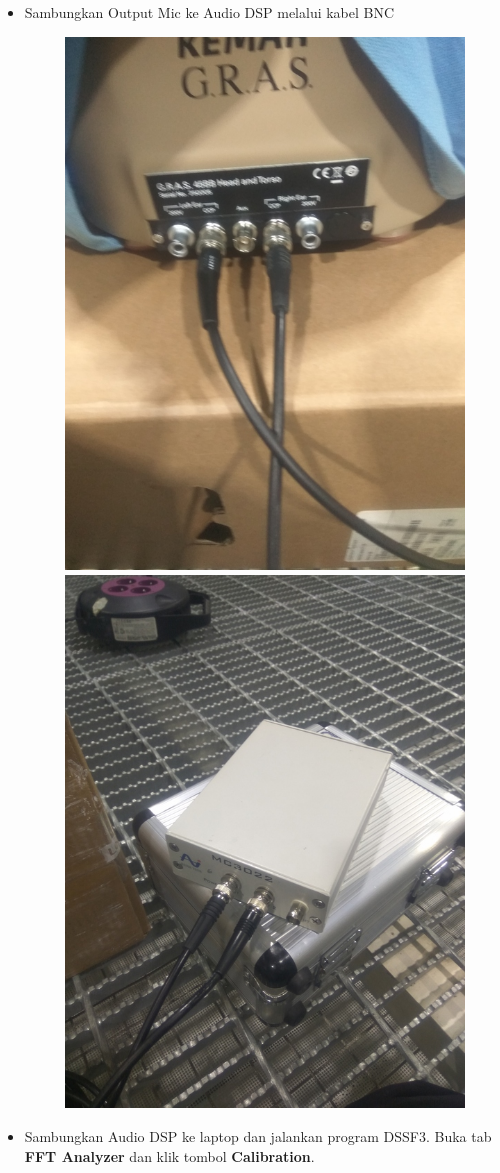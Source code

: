 \documentclass[12pt,]{article}
\begin{document}
\begin{itemize}
		\item Sambungkan Output Mic ke Audio DSP melalui kabel BNC
		\begin{figure}[H]
			\centering
			\includegraphics[width=0.3\linewidth]{day_1/wiring0}
			\includegraphics[width=0.3\linewidth]{day_1/wiring1}
		\end{figure}

		\item Sambungkan Audio DSP ke laptop dan jalankan program DSSF3.
		Buka tab \textbf{FFT Analyzer} dan klik tombol \textbf{Calibration}.


\end{itemize}
\end{document}
